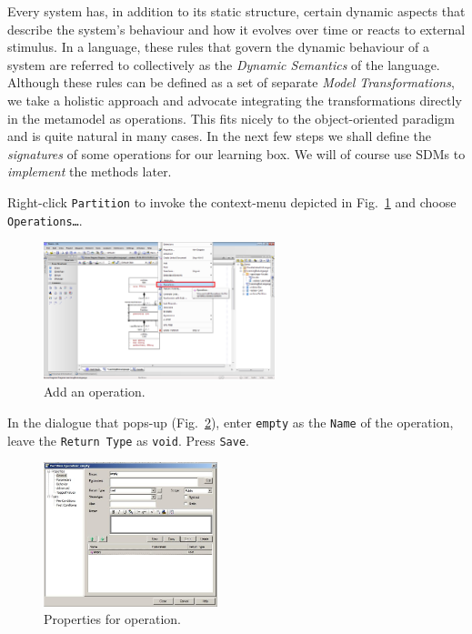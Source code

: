 \clearpage

Every system has, in addition to its static structure, certain dynamic aspects
that describe the system's behaviour and how it evolves over time or reacts to
external stimulus.
In a language, these rules that govern the dynamic behaviour of a system are
referred to collectively as the \emph{Dynamic Semantics} of the language.  
Although these rules can be defined as a set of separate \emph{Model
Transformations}, we take a holistic approach and advocate integrating the
transformations directly in the metamodel as operations.
This fits nicely to the object-oriented paradigm and is quite natural in many
cases.  In the next few steps we shall define the \emph{signatures} of some
operations for our learning box.  We will of course use SDMs to \emph{implement}
the methods later.

Right-click \texttt{Partition} to invoke the context-menu depicted in
Fig.~\ref{fig:add_operation} and choose \texttt{Operations\ldots}.

\begin{figure}[htbp]
	\centering
  \includegraphics[width=0.6\textwidth]{pics/memBoxBilder/memBox35.png}
	\caption{Add an operation.}
	\label{fig:add_operation}
\end{figure}
 
In the dialogue that pops-up (Fig.~\ref{fig:operation_properties}), enter
\texttt{empty} as the \texttt{Name} of the operation, leave the \texttt{Return
Type} as \texttt{void}.  Press \texttt{Save}.
 
\begin{figure}[htbp]
	\centering
  \includegraphics[width=0.45\textwidth]{pics/memBoxBilder/memBox37.png}
	\caption{Properties for operation.}
	\label{fig:operation_properties}
\end{figure}

